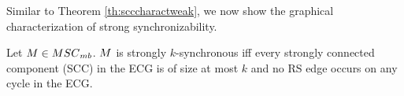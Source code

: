 %

Similar to Theorem \ref{th:scccharactweak}, we now show the graphical characterization of strong synchronizability.

\begin{theorem}\label{theorem:graphical_characterisation_strong}
	Let $\msc \in \mbMSCs$. %
  $M$ is strongly $k$-synchronous iff every strongly connected component (SCC) in the ECG is of size at most $k$ and no RS edge occurs on any cycle in the ECG.
\end{theorem}

